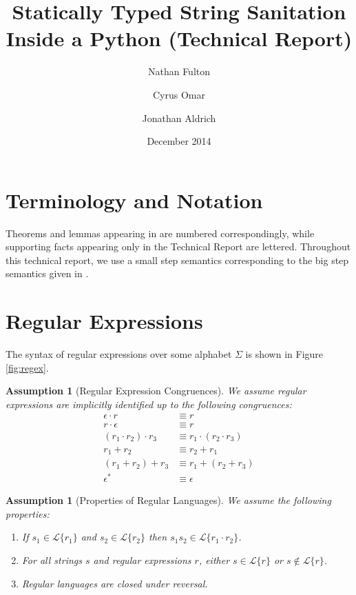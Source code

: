 \documentclass[11pt,leqno]{article}
\title{Statically Typed String Sanitation Inside a Python (Technical Report)}
\author{Nathan Fulton \and Cyrus Omar \and Jonathan Aldrich}
\date{December 2014}
\newtheorem{ass}[tr]{Assumption}
\theoremstyle{definition}
\newcommand{\Lagr}{\mathcal{L}}
\newcommand{\lang}[1]{\Lagr\{#1\}}
\begin{document}
\maketitle

\tableofcontents
\listoffigures
\clearpage


\section{Terminology and Notation}
Theorems and lemmas appearing in \cite{fulton2014} are numbered correspondingly, while supporting facts appearing only in the Technical Report are lettered.
Throughout this technical report, we use a small step semantics corresponding to the big step semantics given in \cite{fulton2014}.

\section{Regular Expressions}
The syntax of regular expressions over some alphabet $\Sigma$ is shown in Figure \ref{fig:regex}. 

\begin{ass}[Regular Expression Congruences]
We assume regular expressions are implicitly identified up to the following congruences:
\begin{align*}
\epsilon\cdot r & \equiv r\\
r \cdot \epsilon & \equiv r\\
(r_1\cdot r_2) \cdot r_3 & \equiv r_1 \cdot (r_2 \cdot r_3)\\
r_1 + r_2 &\equiv r_2 + r_1\\
(r_1 + r_2) + r_3 &\equiv r_1 + (r_2 + r_3)\\
\epsilon^* & \equiv \epsilon
\end{align*}
\end{ass}

\begin{ass}[Properties of Regular Languages] \label{thm:regexprops}
We assume the following properties:
\begin{enumerate}

\item If $s_1 \in \lang{r_1}$ and $s_2 \in \lang{r_2}$ then $s_1s_2 \in \lang{r_1\cdot r_2}$.
\item For all strings $s$ and regular expressions $r$, either $s \in \lang{r}$ or $s \not \in \lang{r}$.
\item Regular languages are closed under reversal.
\end{enumerate}
\end{ass}
\end{document}
